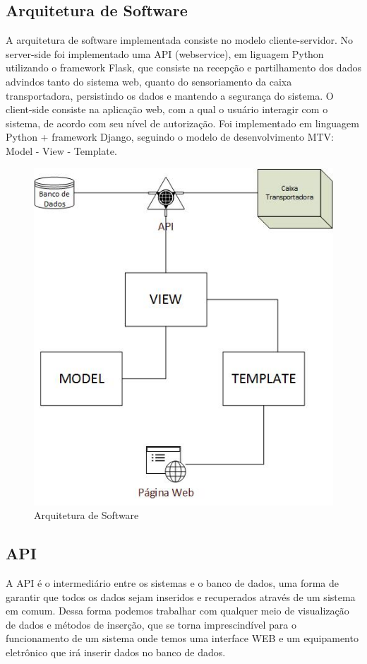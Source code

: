 \subsection{Arquitetura de Software}
A arquitetura de software implementada consiste no modelo cliente-servidor. No server-side foi implementado uma API (webservice), em liguagem Python utilizando o framework Flask, que consiste na recepção e partilhamento dos dados advindos tanto do sistema web, quanto do sensoriamento da caixa transportadora, persistindo os dados e mantendo a segurança do sistema. O client-side consiste na aplicação web, com a qual o usuário interagir com o sistema, de acordo com seu nível de autorização. Foi implementado em linguagem Python + framework Django, seguindo o modelo de desenvolvimento MTV: Model - View - Template.

\begin{figure}[H]
	\centering
	\includegraphics[width=12cm]{figuras/arquitetura_software.jpg}
	\caption{Arquitetura de Software}
\end{figure}
		
			
			\subsection{API}
			
			A API é o intermediário entre os sistemas e o banco de dados, uma forma de garantir que todos os dados sejam inseridos e recuperados através de um sistema em comum. Dessa forma podemos trabalhar com qualquer meio de visualização de dados e métodos de inserção, que se torna imprescindível para o funcionamento de um sistema onde temos uma interface WEB e um equipamento eletrônico que irá inserir dados no banco de dados.
			
